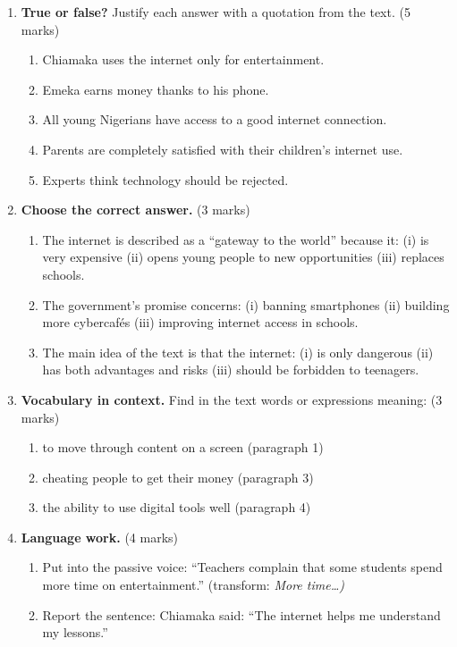 \documentclass[11pt]{article}
\newcommand{\eng}[1]{\ifmmode\text{\textit{#1}}\else\begingroup\selectlanguage{english}\itshape #1\endgroup\fi}
\begin{document}
\begin{exercice}
\begin{enumerate}
\item \textbf{True or false?} Justify each answer with a quotation from the text. (5 marks)
\begin{enumerate}
\item[a)] Chiamaka uses the internet only for entertainment.
\item[b)] Emeka earns money thanks to his phone.
\item[c)] All young Nigerians have access to a good internet connection.
\item[d)] Parents are completely satisfied with their children's internet use.
\item[e)] Experts think technology should be rejected.
\end{enumerate}
\item \textbf{Choose the correct answer.} (3 marks)
\begin{enumerate}
\item[a)] The internet is described as a “gateway to the world” because it: (i) is very expensive (ii) opens young people to new opportunities (iii) replaces schools.
\item[b)] The government's promise concerns: (i) banning smartphones (ii) building more cybercafés (iii) improving internet access in schools.
\item[c)] The main idea of the text is that the internet: (i) is only dangerous (ii) has both advantages and risks (iii) should be forbidden to teenagers.
\end{enumerate}
\item \textbf{Vocabulary in context.} Find in the text words or expressions meaning: (3 marks)
\begin{enumerate}
\item[a)] to move through content on a screen (paragraph 1)
\item[b)] cheating people to get their money (paragraph 3)
\item[c)] the ability to use digital tools well (paragraph 4)
\end{enumerate}
\item \textbf{Language work.} (4 marks)
\begin{enumerate}
\item[a)] Put into the passive voice: “Teachers complain that some students spend more time on entertainment.” (transform: \eng{More time\ldots})
\item[b)] Report the sentence: Chiamaka said: “The internet helps me understand my lessons.”
\end{enumerate}
\end{enumerate}
\end{exercice}
\end{document}
